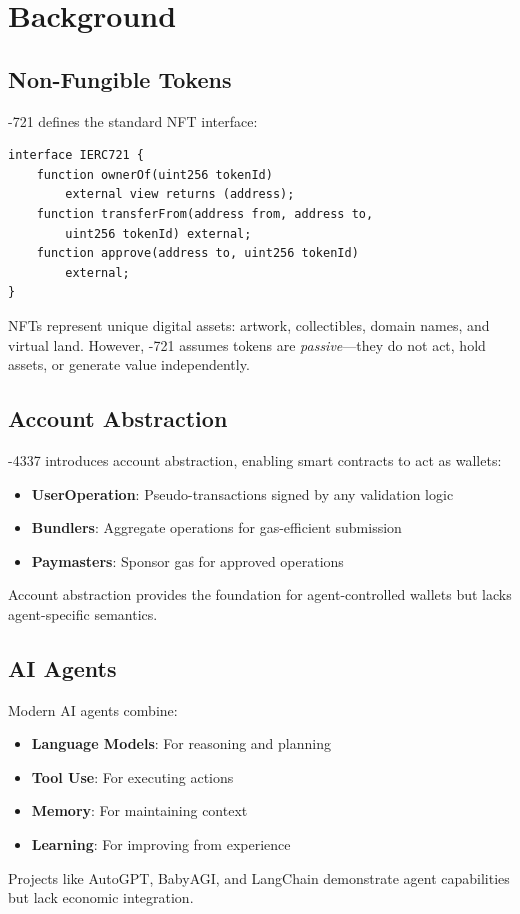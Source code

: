 \section{Background}


\subsection{Non-Fungible Tokens}

\ERC{}-721 defines the standard NFT interface:

\begin{lstlisting}[language=Solidity,caption=ERC-721 Interface (Simplified)]
interface IERC721 {
    function ownerOf(uint256 tokenId)
        external view returns (address);
    function transferFrom(address from, address to,
        uint256 tokenId) external;
    function approve(address to, uint256 tokenId)
        external;
}
\end{lstlisting}

NFTs represent unique digital assets: artwork, collectibles, domain names, and virtual land. However, \ERC{}-721 assumes tokens are \emph{passive}---they do not act, hold assets, or generate value independently.

\subsection{Account Abstraction}

\ERC{}-4337 introduces account abstraction, enabling smart contracts to act as wallets:

\begin{itemize}
    \item \textbf{UserOperation}: Pseudo-transactions signed by any validation logic
    \item \textbf{Bundlers}: Aggregate operations for gas-efficient submission
    \item \textbf{Paymasters}: Sponsor gas for approved operations
\end{itemize}

Account abstraction provides the foundation for agent-controlled wallets but lacks agent-specific semantics.

\subsection{AI Agents}

Modern AI agents combine:

\begin{itemize}
    \item \textbf{Language Models}: For reasoning and planning
    \item \textbf{Tool Use}: For executing actions
    \item \textbf{Memory}: For maintaining context
    \item \textbf{Learning}: For improving from experience
\end{itemize}

Projects like AutoGPT, BabyAGI, and LangChain demonstrate agent capabilities but lack economic integration.

